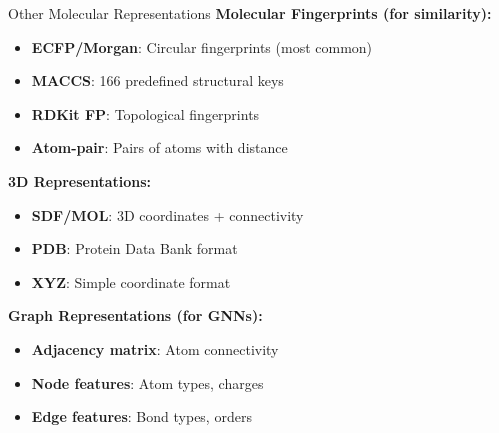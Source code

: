 \documentclass{beamer}
\begin{document}
\begin{frame}{Other Molecular Representations}
    \small
    \textbf{Molecular Fingerprints (for similarity):}
    \begin{itemize}
        \item \textbf{ECFP/Morgan}: Circular fingerprints (most common)
        \item \textbf{MACCS}: 166 predefined structural keys
        \item \textbf{RDKit FP}: Topological fingerprints
        \item \textbf{Atom-pair}: Pairs of atoms with distance
    \end{itemize}
    \vspace{0.3em}
    
    \textbf{3D Representations:}
    \begin{itemize}
        \item \textbf{SDF/MOL}: 3D coordinates + connectivity
        \item \textbf{PDB}: Protein Data Bank format
        \item \textbf{XYZ}: Simple coordinate format
    \end{itemize}
    \vspace{0.3em}
    
    \textbf{Graph Representations (for GNNs):}
    \begin{itemize}
        \item \textbf{Adjacency matrix}: Atom connectivity
        \item \textbf{Node features}: Atom types, charges
        \item \textbf{Edge features}: Bond types, orders
    \end{itemize}
\end{frame}
\end{document}
